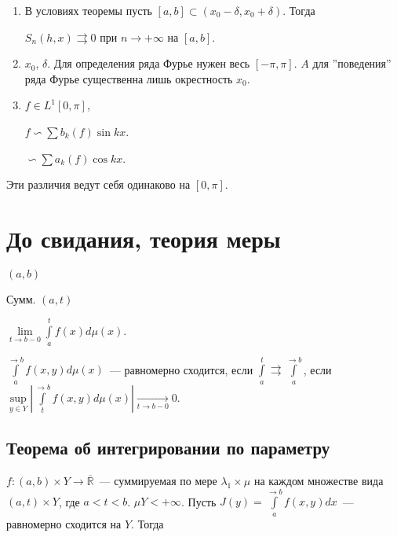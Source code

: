 \documentclass{article}
\begin{document}
                \begin{enumerate}
        
                    \item В условиях теоремы пусть $[a, b] \subset (x_0 - \delta, x_0 + \delta)$. Тогда
            
                    $S_n(h, x) \rightrightarrows 0$ при $n \rightarrow +\infty$ на $[a, b]$.
                
                    \item $x_0$, $\delta$. Для определения ряда Фурье нужен весь $[-\pi, \pi]$. $A$ для ''поведения'' ряда Фурье существенна лишь окрестность $x_0$.
            
                    \item $f \in L^1 [0, \pi]$, 
            
                    $f \backsim \sum b_k(f) \sin {kx}$.
            
                    $\backsim \sum a_k(f) \cos {kx}$.
            
                \end{enumerate}
        
            Эти различия ведут себя одинаково на $[0, \pi]$.
        
\newpage

\section{До свидания, теория меры}

    $(a, b)$
    
    Сумм. $(a, t)$
    
    $\lim\limits_{t \rightarrow b-0} \int\limits^t_a f(x) d \mu(x)$.
    
    $\int\limits^{\rightarrow b}_a f(x, y) d \mu(x)$~--- равномерно сходится, если $\int\limits^t_a \rightrightarrows \int\limits^{\rightarrow b}_a$, если $\sup\limits_{y \in Y} \left| \int\limits^{\rightarrow b}_t f(x, y) d \mu(x) \right| \xrightarrow[t \rightarrow b - 0]{} 0$.
    
    \subsection{Теорема об интегрировании по параметру}
    
        $f : (a, b) \times Y \rightarrow \overline{\mathbb{R}}$~--- суммируемая по мере $\lambda_1 \times \mu$ на каждом множестве вида $(a, t) \times Y$, где $a < t < b$. $\mu Y < +\infty$. Пусть $J(y) = \int\limits^{\rightarrow b}_a f(x, y) dx$~--- равномерно сходится на $Y$. Тогда
        
\end{document}
